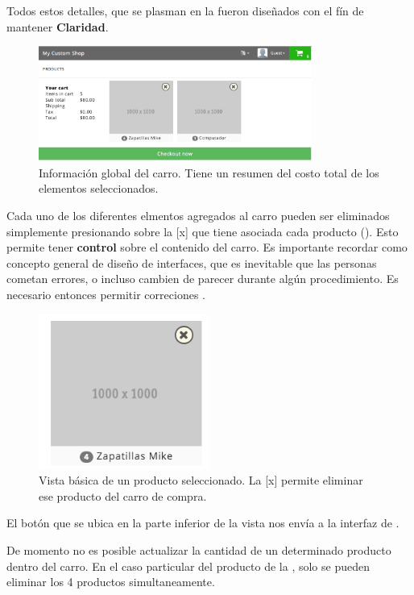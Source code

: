 		Todos estos detalles, que se plasman en la  fueron diseñados con el fín de mantener \textbf{Claridad}.

		\begin{figure}[H]
			\centering
			\includegraphics[width=0.8\textwidth]{figuras/solution/cart/view.png}
			\caption{Información global del carro. Tiene un resumen del costo total de los elementos seleccionados.}
			\label{figure:solution:cart:view}
		\end{figure}

		Cada uno de los diferentes elmentos agregados al carro pueden ser eliminados simplemente presionando sobre la [x] que tiene asociada cada producto (). Esto permite tener \textbf{control} sobre el contenido del carro. Es importante recordar como concepto general de diseño de interfaces, que es inevitable que las personas cometan errores, o incluso cambien de parecer durante algún procedimiento. Es necesario entonces permitir correciones \cite{online_goodgui_org}. 

		\begin{figure}[H]
			\centering
			\includegraphics[width=0.5\textwidth]{figuras/solution/cart/producto.png}
			\caption{Vista básica de un producto seleccionado. La [x] permite eliminar ese producto del carro de compra.}
			\label{figure:solution:cart:product}
		\end{figure}

		El botón \checkoutNowLABEL que se ubica en la parte inferior de la vista  nos envía a la interfaz de .

		De momento no es posible actualizar la cantidad de un determinado producto dentro del carro. En el caso particular del producto de la , solo se pueden eliminar los 4 productos simultaneamente.


